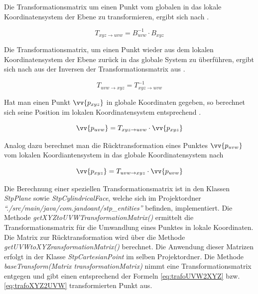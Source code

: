 Die Transformationsmatrix um einen Punkt vom globalen in das lokale Koordinatensystem der Ebene zu transformieren, ergibt sich nach .

\begin{equation}\label{eq:trafoXYZ2UVW}
T_{xyz \rightarrow uvw} = B_{uvw}^{-1} \cdot B_{xyz}  
\end{equation}   

Die Transformationsmatrix, um einen Punkt wieder aus dem lokalen Koordinatensystem der Ebene zurück in das globale System zu überführen, ergibt sich nach  aus der Inversen der Transformationsmatrix aus .

\begin{equation}\label{eq:trafoUVW2XYZ}
T_{uvw \rightarrow xyz} = T_{xyz \rightarrow uvw}^{-1} 
\end{equation}   

Hat man einen Punkt $\vv{p_{xyz}}$ in globale Koordinaten gegeben, so berechnet sich seine Position im lokalen Koordinatensystem entsprechend . 

\begin{equation}\label{eq:pxyz2puvw}
\vv{p_{uvw}}=T_{xyz \rightarrow uvw} \cdot \vv{p_{xyz}}
\end{equation}

Analog dazu berechnet man die Rücktransformation eines Punktes $\vv{p_{uvw}}$ vom lokalen Koordiantensystem in das globale Koordinatensystem nach 
  
\begin{equation}\label{eq:trafoUVW2XYZ}
\vv{p_{xyz}}=T_{uvw \rightarrow xyz} \cdot \vv{p_{uvw}}
\end{equation}

Die Berechnung einer speziellen Transformationsmatrix ist in den Klassen \textit{StpPlane} sowie \textit{StpCylindricalFace}, welche sich im Projektordner \textit{"`./src/main/java/com.jandoant/stp\_entities"'} befinden, implementiert. Die Methode \textit{getXYZtoUVWTransformationMatrix()} ermittelt die Transformationsmatrix für die Umwandlung eines Punktes in lokale Koordinaten. Die Matrix zur Rücktransformation wird über die Methode \textit{getUVWtoXYZransformationMatrix()} berechnet. 
Die Anwendung dieser Matrizen erfolgt in der Klasse \textit{StpCartesianPoint} im selben Projektordner. Die Methode \textit{baseTransform(Matrix transformationMatrix)} nimmt eine Transformationsmatrix entgegen und gibt einen entsprechend der Formeln \ref{eq:trafoUVW2XYZ} bzw. \ref{eq:trafoXYZ2UVW} transformierten Punkt aus. 


